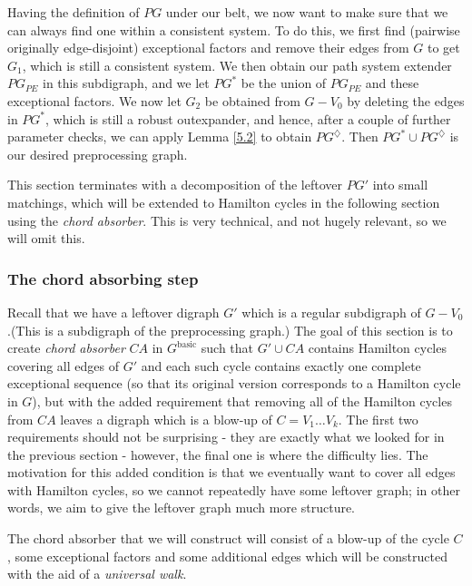 \documentclass[10pt,letterpaper, reqno]{amsart}
\theoremstyle{definition}
\numberwithin{equation}{section}
\begin{document}
Having the definition of $PG$ under our belt, we now want to make sure that we can always find one within a consistent system. To do this, we first find (pairwise originally edge-disjoint) exceptional factors and remove their edges from $G$ to get $G_1$, which is still a consistent system. We then obtain our path system extender $PG_{PE}$ in this subdigraph, and we let $PG^*$ be the union of $PG_{PE}$ and these exceptional factors. We now let $G_2$ be obtained from $G-V_0$ by deleting the edges in $PG^*$, which is still a robust outexpander, and hence, after a couple of further parameter checks, we can apply Lemma \ref{5.2} to obtain $PG^\diamondsuit$. Then $PG^* \cup PG^\diamondsuit$ is our desired preprocessing graph. 

This section terminates with a decomposition of the leftover $PG'$ into small matchings, which will be extended to Hamilton cycles in the following section using the \textit{chord absorber}. This is very technical, and not hugely relevant, so we will omit this.

\subsubsection{The chord absorbing step}
Recall that we have a leftover digraph $G'$ which is a regular subdigraph of $G-V_0$.(This is a subdigraph of the preprocessing graph.) The goal of this section is to create \textit{chord absorber} $CA$ in $G^\text{basic}$ such that $G' \cup CA$ contains Hamilton cycles covering all edges of $G'$ and each such cycle contains exactly one complete exceptional sequence (so that its original version corresponds to a Hamilton cycle in $G$), but with the added requirement that removing all of the Hamilton cycles from $CA$ leaves a digraph which is a blow-up of $C=V_1\dots V_k$. The first two requirements should not be surprising - they are exactly what we looked for in the previous section - however, the final one is where the difficulty lies. The motivation for this added condition is that we eventually want to cover all edges with Hamilton cycles, so we cannot repeatedly have some leftover graph; in other words, we aim to give the leftover graph much more structure. 

The chord absorber that we will construct will consist of a blow-up of the cycle $C$, some exceptional factors and some additional edges which will be constructed with the aid of a \textit{universal walk}. 
\end{document}
